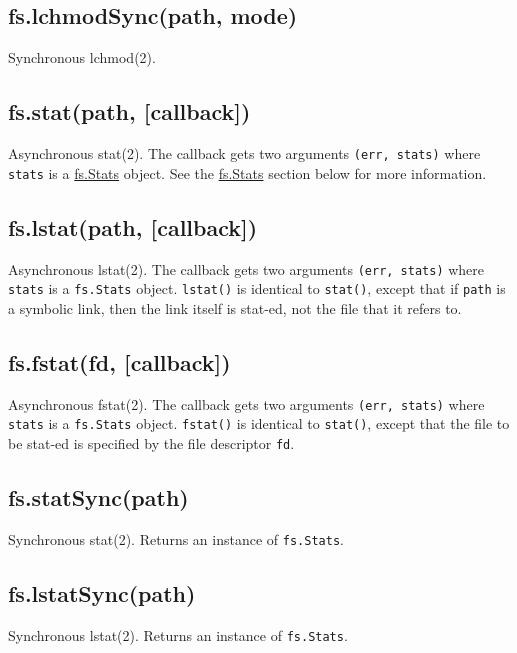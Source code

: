 \subsection{fs.lchmodSync(path, mode)}

Synchronous lchmod(2).

\subsection{fs.stat(path, {[}callback{]})}

Asynchronous stat(2). The callback gets two arguments
\texttt{(err, stats)} where \texttt{stats} is a
\hyperref[fs_class_fs_stats]{fs.Stats} object. See the
\hyperref[fs_class_fs_stats]{fs.Stats} section below for more
information.

\subsection{fs.lstat(path, {[}callback{]})}

Asynchronous lstat(2). The callback gets two arguments
\texttt{(err, stats)} where \texttt{stats} is a \texttt{fs.Stats}
object. \texttt{lstat()} is identical to \texttt{stat()}, except that if
\texttt{path} is a symbolic link, then the link itself is stat-ed, not
the file that it refers to.

\subsection{fs.fstat(fd, {[}callback{]})}

Asynchronous fstat(2). The callback gets two arguments
\texttt{(err, stats)} where \texttt{stats} is a \texttt{fs.Stats}
object. \texttt{fstat()} is identical to \texttt{stat()}, except that
the file to be stat-ed is specified by the file descriptor \texttt{fd}.

\subsection{fs.statSync(path)}

Synchronous stat(2). Returns an instance of \texttt{fs.Stats}.

\subsection{fs.lstatSync(path)}

Synchronous lstat(2). Returns an instance of \texttt{fs.Stats}.

